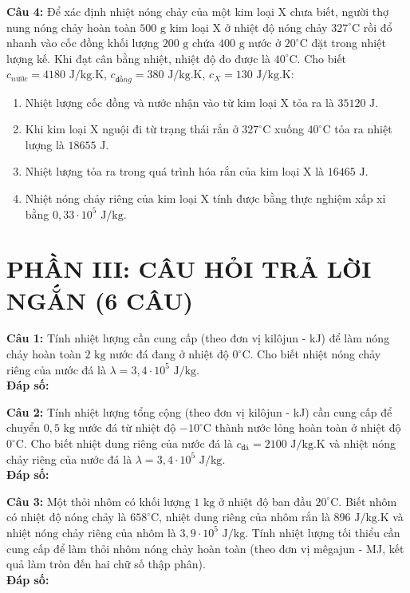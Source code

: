 \documentclass[12pt,a4paper]{article}
\begin{document}
\textbf{Câu 4:} Để xác định nhiệt nóng chảy của một kim loại X chưa biết, người thợ nung nóng chảy hoàn toàn $500\text{ g}$ kim loại X ở nhiệt độ nóng chảy $327^{\circ}\text{C}$ rồi đổ nhanh vào cốc đồng khối lượng $200\text{ g}$ chứa $400\text{ g}$ nước ở $20^{\circ}\text{C}$ đặt trong nhiệt lượng kế. Khi đạt cân bằng nhiệt, nhiệt độ đo được là $40^{\circ}\text{C}$. Cho biết $c_{nước} = 4180\text{ J/kg.K}$, $c_{đồng} = 380\text{ J/kg.K}$, $c_{X} = 130\text{ J/kg.K}$:
\begin{enumerate}[label=\alph*)]
  \item Nhiệt lượng cốc đồng và nước nhận vào từ kim loại X tỏa ra là $35120\text{ J}$.
  \item Khi kim loại X nguội đi từ trạng thái rắn ở $327^{\circ}\text{C}$ xuống $40^{\circ}\text{C}$ tỏa ra nhiệt lượng là $18655\text{ J}$.
  \item Nhiệt lượng tỏa ra trong quá trình hóa rắn của kim loại X là $16465\text{ J}$.
  \item Nhiệt nóng chảy riêng của kim loại X tính được bằng thực nghiệm xấp xỉ bằng $0{,}33 \cdot 10^5\text{ J/kg}$.
\end{enumerate}

\section*{PHẦN III: CÂU HỎI TRẢ LỜI NGẮN (6 CÂU)}

\textbf{Câu 1:} Tính nhiệt lượng cần cung cấp (theo đơn vị kilôjun - kJ) để làm nóng chảy hoàn toàn $2\text{ kg}$ nước đá đang ở nhiệt độ $0^{\circ}\text{C}$. Cho biết nhiệt nóng chảy riêng của nước đá là $\lambda = 3{,}4 \cdot 10^5\text{ J/kg}$.\\
\textbf{Đáp số:} \dotfill

\textbf{Câu 2:} Tính nhiệt lượng tổng cộng (theo đơn vị kilôjun - kJ) cần cung cấp để chuyển $0{,}5\text{ kg}$ nước đá từ nhiệt độ $-10^{\circ}\text{C}$ thành nước lỏng hoàn toàn ở nhiệt độ $0^{\circ}\text{C}$. Cho biết nhiệt dung riêng của nước đá là $c_{đá} = 2100\text{ J/kg.K}$ và nhiệt nóng chảy riêng của nước đá là $\lambda = 3{,}4 \cdot 10^5\text{ J/kg}$.\\
\textbf{Đáp số:} \dotfill

\textbf{Câu 3:} Một thỏi nhôm có khối lượng $1\text{ kg}$ ở nhiệt độ ban đầu $20^{\circ}\text{C}$. Biết nhôm có nhiệt độ nóng chảy là $658^{\circ}\text{C}$, nhiệt dung riêng của nhôm rắn là $896\text{ J/kg.K}$ và nhiệt nóng chảy riêng của nhôm là $3{,}9 \cdot 10^5\text{ J/kg}$. Tính nhiệt lượng tối thiểu cần cung cấp để làm thỏi nhôm nóng chảy hoàn toàn (theo đơn vị mêgajun - MJ, kết quả làm tròn đến hai chữ số thập phân).\\
\textbf{Đáp số:} \dotfill
\end{document}
